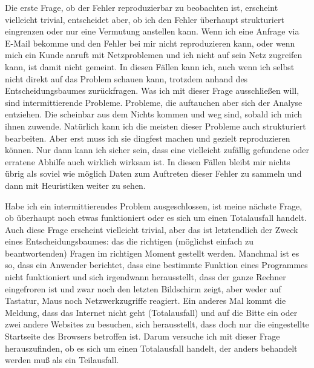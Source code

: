 \begin{normaltext}
  Die erste Frage, ob der Fehler reproduzierbar zu beobachten ist, erscheint
  vielleicht trivial, entscheidet aber, ob ich den Fehler überhaupt
  strukturiert eingrenzen oder nur eine Vermutung anstellen kann.
  Wenn ich eine Anfrage via E-Mail bekomme und den Fehler bei mir nicht
  reproduzieren kann, oder wenn mich ein Kunde anruft mit Netzproblemen und
  ich nicht auf sein Netz zugreifen kann, ist damit nicht gemeint. In diesen
  Fällen kann ich, auch wenn ich selbst nicht direkt auf das Problem schauen
  kann, trotzdem anhand des Entscheidungsbaumes zurückfragen. Was ich mit
  dieser Frage ausschließen will, sind intermittierende Probleme. Probleme,
  die auftauchen aber sich der Analyse entziehen. Die scheinbar aus dem Nichts
  kommen und weg sind, sobald ich mich ihnen zuwende. Natürlich kann ich
  die meisten dieser Probleme auch strukturiert bearbeiten. Aber erst muss ich
  sie dingfest machen und gezielt reproduzieren können. Nur dann kann ich
  sicher sein, dass eine vielleicht zufällig gefundene oder erratene Abhilfe
  auch wirklich wirksam ist. In diesen Fällen bleibt mir nichts übrig als
  soviel wie möglich Daten zum Auftreten dieser Fehler zu sammeln und dann mit
  Heuristiken weiter zu sehen.

  Habe ich ein intermittierendes Problem ausgeschlossen, ist meine nächste
  Frage, ob überhaupt noch etwas funktioniert oder es sich um einen
  Totalausfall handelt. Auch diese Frage erscheint vielleicht trivial, aber
  das ist letztendlich der Zweck eines Entscheidungsbaumes: das die richtigen
  (möglichst einfach zu beantwortenden) Fragen im richtigen Moment gestellt
  werden. Manchmal ist es so, dass ein Anwender berichtet, dass eine bestimmte
  Funktion eines Programmes nicht funktioniert und sich irgendwann
  herausstellt, dass der ganze Rechner eingefroren ist und zwar noch den
  letzten Bildschirm zeigt, aber weder auf Tastatur, Maus noch
  Netzwerkzugriffe reagiert. Ein anderes Mal kommt die Meldung, dass das
  Internet nicht geht (Totalausfall) und auf die Bitte ein oder zwei andere
  Websites zu besuchen, sich herausstellt, dass doch nur die eingestellte
  Startseite des Browsers betroffen ist. Darum versuche ich mit dieser Frage
  herauszufinden, ob es sich um einen Totalausfall handelt, der anders
  behandelt werden muß als ein Teilausfall.


\end{normaltext}
